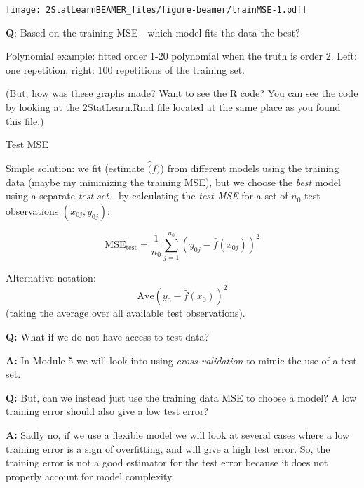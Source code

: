 \documentclass[ignorenonframetext,]{beamer}
\begin{document}
\begin{frame}

\texttt{[image: 2StatLearnBEAMER\_files/figure-beamer/trainMSE-1.pdf]}

\textbf{Q}: Based on the training MSE - which model fits the data the
best?

Polynomial example: fitted order 1-20 polynomial when the truth is order
2. Left: one repetition, right: 100 repetitions of the training set.

(But, how was these graphs made? Want to see the R code? You can see the
code by looking at the 2StatLearn.Rmd file located at the same place as
you found this file.)

\end{frame}

\begin{frame}

\begin{block}{Test MSE}

Simple solution: we fit (estimate \(\hat(f)\)) from different models
using the training data (maybe my minimizing the training MSE), but we
choose the \emph{best} model using a separate \emph{test set} - by
calculating the \emph{test MSE} for a set of \(n_0\) test observations
\((x_{0j},y_{0j})\):

\[ \text{MSE}_{\text{test}}=\frac{1}{n_0}\sum_{j=1}^{n_0} (y_{0j}-\hat{f}(x_{0j}))^2\]

Alternative notation: \[\text{Ave}(y_0-\hat{f}(x_0))^2\] (taking the
average over all available test observations).

\end{block}

\end{frame}

\begin{frame}

\textbf{Q:} What if we do not have access to test data?

\textbf{A:} In Module 5 we will look into using \emph{cross validation}
to mimic the use of a test set.

\textbf{Q:} But, can we instead just use the training data MSE to choose
a model? A low training error should also give a low test error?

\textbf{A:} Sadly no, if we use a flexible model we will look at several
cases where a low training error is a sign of overfitting, and will give
a high test error. So, the training error is not a good estimator for
the test error because it does not properly account for model
complexity.

\end{frame}
\end{document}
